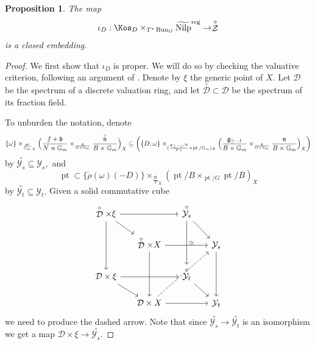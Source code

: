 \documentclass[9pt]{amsart}
\DeclareMathOperator{\pt}{{pt}}
\DeclareMathOperator{\reg}{{reg}}
\newcommand{\bG}{{\mathbb G}}
\newcommand{\cD}{{\mathcal D}}
\newcommand{\cY}{{\mathcal Y}}
\newcommand{\cZ}{{\mathcal Z}}
\DeclareMathOperator{\Nilp}{{Nilp}} \DeclareMathOperator{\op}{{op}}
\newtheorem{pr}[subsubsection]{Proposition}
\numberwithin{equation}{section}
\begin{document}
\begin{pr}\label{intersection and zastava closed embedding}
	The map $$\iota_{D}: \Kos_D \times_{T^* \Bun_G} \widetilde{\Nilp}^{\reg} \rightarrow \stackrel{\circ}{\cZ}$$ is a closed embedding.
\end{pr}

\begin{proof}
	
	We first show that $\iota_D$ is proper. We will do so by checking the valuative criterion, following an argument of \cite[Appendix A]{FKM}. 
	Denote by $\xi$ the generic point of $X$. Let $\cD$ be the spectrum of a discrete valuation ring, and let $\stackrel{\circ}{\cD} \subset \cD$  be the spectrum of its fraction field. 
	
	To unburden the notation, denote 
	$$ \{ \omega\}\times_{{\frac{\pt}{\bG_m}}_X} \Bigl(\frac{f+\mathfrak{b}}{N \rtimes \bG_m} \times_{\frac{\mathfrak{g}}{G \times \bG_m}} \frac{\stackrel{\circ}{\mathfrak{n}}}{B \times \bG_m}\Bigr)_X \subseteq  \biggl(\{ D , \omega\}\times_{(\frac{\mathfrak{g_{\geq -1}}/\mathfrak{b}}{T \times}  \times \pt / \bG_m)_X} \Bigl(\frac{\mathfrak{g}_{\geq -1}}{B \times \bG_m} \times_{\frac{\mathfrak{g}}{G \times \bG_m}} \frac{\mathfrak{n}}{B\times \bG_m}\Bigr)_X\biggr) $$
	by $\stackrel{\circ}{\cY_s} \subseteq \cY_s,$
	and 
	$$\pt\subset \{ \check{\rho}(\omega)(-D) \}\times_{\frac{\pt}{T}_X} (\pt/B \times_{\pt/G} \pt/B)_X$$
	by $\stackrel{\circ}{\cY_t} \subseteq \cY_t.$ Given a solid commutative cube
	\begin{equation}\label{cube}
	\begin{tikzcd}[row sep=1.5em, column sep = 1.5em]
	\stackrel{\circ}{\cD}\times \xi \arrow[rr] \arrow[dr, ,""] \arrow[dd,swap] &&
	\stackrel{\circ}{\cY_s} \arrow[dd, "\simeq"] \arrow[dr,""] \\
	& \stackrel{\circ}{\cD}\times X \arrow[dd] \arrow[rr] &&
	\cY_s\arrow[dd,""] \\
	\cD \times \xi \arrow[rr,] \arrow[dr, ""] && \stackrel{\circ}{\cY_t} \arrow[dr] \\
	& \cD \times X \arrow[rr] \arrow[rruu, dashed]&& \cY_t
	\end{tikzcd}
	\end{equation}
	we need to produce the dashed arrow. Note that since $ \stackrel{\circ}{\cY_s} \rightarrow  \stackrel{\circ}{\cY_t}$ is an isomorphism we get a map $\cD \times \xi \rightarrow \stackrel{\circ}{\cY_s}$.
	

\end{proof}
\end{document}
